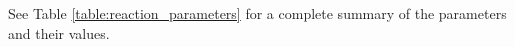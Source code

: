 \documentclass[gmd, manuscript]{copernicus}
\begin{document}
See Table \ref{table:reaction_parameters} for a complete summary of the parameters and their values.
\end{document}
